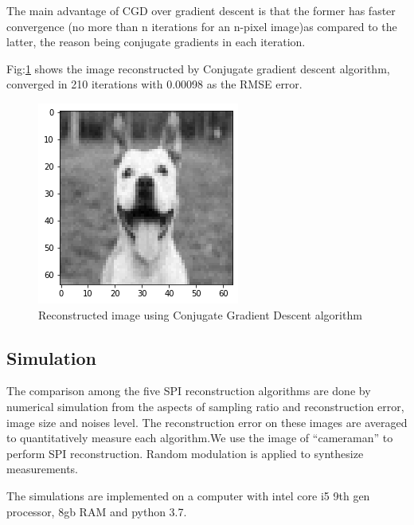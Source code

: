 \documentclass[conference]{IEEEtran}
\begin{document}
\begin{itemize}
\begin{itemize}
        
        The main advantage of CGD over gradient descent is that the former has faster convergence (no more than n iterations for an n-pixel image)as compared to the latter, the reason being conjugate gradients in each iteration.
        \par Fig:\ref{fig:conjugate_gradient_descent_normal} shows the image reconstructed by Conjugate gradient descent algorithm, converged in 210 iterations with 0.00098 as the RMSE error.
        \begin{figure}[ht]
               \centering
             \includegraphics[width=0.6\linewidth]{figures/conjugate_gradient_descent.png}
                \caption{Reconstructed image using Conjugate Gradient Descent algorithm}
        \label{fig:conjugate_gradient_descent_normal}
        \end{figure}
        \end{itemize}
\end{itemize}

\subsection{Simulation}
\par The comparison among the five SPI reconstruction algorithms are done by numerical simulation from the aspects of sampling ratio and reconstruction error, image size and noises level. The reconstruction error on these images are averaged to quantitatively measure each algorithm.We use the image of “cameraman” to perform SPI reconstruction. Random modulation is applied to synthesize measurements.
\par The simulations are implemented on a computer with intel core i5 9th gen processor, 8gb RAM and python 3.7.
\end{document}
